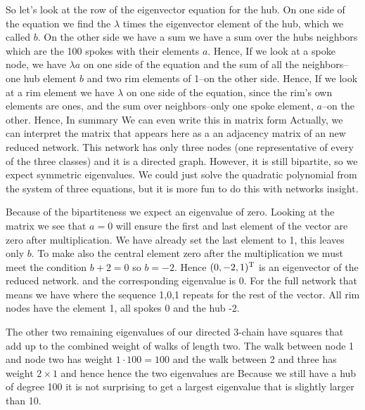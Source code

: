 So let's look at the row of the eigenvector equation for the hub. On one side of the equation we find the $\lambda$ times the eigenvector element of the hub, which we called $b$. On the other side we have a sum we have a sum over the hubs neighbors which are the 100 spokes with their elements $a$. Hence,
If we look at a spoke node, we have $\lambda a$ on one side of the equation and the sum of all the neighbors--one hub element $b$ and two rim elements of 1--on the other side. Hence,
If we look at a rim element we have $\lambda$ on one side of the equation, since the rim's own elements are ones,  and the sum over neighbors--only one spoke element, $a$--on the other. Hence, 
In summary 
We can even write this in matrix form 
Actually, we can interpret the matrix that appears here as a an adjacency matrix of an new reduced network. This network has only three nodes (one representative of every of the three classes) and it is a directed graph. However, it is still bipartite, so we expect symmetric eigenvalues. We could just solve the quadratic polynomial from the system of three equations, but it is more fun to do this with networks insight. 

Because of the bipartiteness we expect an eigenvalue of zero. Looking at the matrix we see that $a=0$ will ensure the first and last element of the vector are zero after multiplication. We have already set the last element to 1, this leaves only $b$. To make also the central element zero after the multiplication we must meet the condition $b+2=0$ so $b=-2$. Hence $(0,-2,1)^{\rm T}$ is an eigenvector of the reduced network. and the corresponding eigenvalue is 0. For the full network that means we have 
where the sequence 1,0,1 repeats for the rest of the vector. All rim nodes have the element 1, all spokes 0 and the hub -2.

The other two remaining eigenvalues of our directed 3-chain have squares that add up to the combined weight of walks of length two. The walk between node 1 and node two has weight $1\cdot100=100$ and the walk between 2 and three has weight $2\times 1$ and hence 
hence the two eigenvalues are 
Because we still have a hub of degree 100 it is not surprising to get a largest eigenvalue that is slightly larger than 10. 

